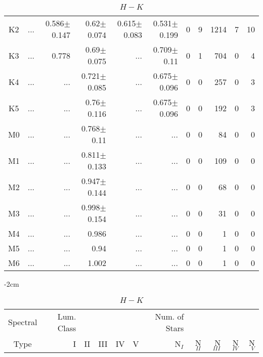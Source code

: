 \begin{table}[t]
\begin{table}[t]
\begin{center}
\begin{tabular}{c|rrrrr|rrrrr}
    K2	&	 ...	&	0.586$\pm$0.147	&	0.62$\pm$0.074	&	0.615$\pm$0.083	&	0.531$\pm$0.199	&	0	&	9	&	1214	&	7	&	10	\\
    K3	&	 ...	&	0.778	&	0.69$\pm$0.075	&	 ...	&	0.709$\pm$0.11	&	0	&	1	&	704	&	0	&	4	\\
    K4	&	 ...	&	 ...	&	0.721$\pm$0.085	&	 ...	&	0.675$\pm$0.096	&	0	&	0	&	257	&	0	&	3	\\
    K5	&	 ...	&	 ...	&	0.76$\pm$0.116	&	 ...	&	0.675$\pm$0.096	&	0	&	0	&	192	&	0	&	3	\\
    M0	&	 ...	&	 ...	&	0.768$\pm$0.11	&	 ...	&	 ...	&	0	&	0	&	84	&	0	&	0	\\
    M1	&	 ...	&	 ...	&	0.811$\pm$0.133	&	 ...	&	 ...	&	0	&	0	&	109	&	0	&	0	\\
    M2	&	 ...	&	 ...	&	0.947$\pm$0.144	&	 ...	&	 ...	&	0	&	0	&	68	&	0	&	0	\\
    M3	&	 ...	&	 ...	&	0.998$\pm$0.154	&	 ...	&	 ...	&	0	&	0	&	31	&	0	&	0	\\
    M4	&	 ...	&	 ...	&	0.986	&	 ...	&	 ...	&	0	&	0	&	1	&	0	&	0	\\
    M5	&	 ...	&	 ...	&	0.94	&	 ...	&	 ...	&	0	&	0	&	1	&	0	&	0	\\
    M6	&	 ...	&	 ...	&	1.002	&	 ...	&	 ...	&	0	&	0	&	1	&	0	&	0	\\
        \bottomrule
        \end{tabular}
    \end{center}
    \end{table}
    
    
    \begin{table}[t]
    \tiny
    \centering
    \caption{$H-K$}
    \begin{center}
        \addtolength{\leftskip} {-2cm}
        \addtolength{\rightskip}{-2cm}
        \begin{tabular}{c|rrrrr|rrrrr}
        \toprule
        Spectral & Lum. Class & & & & & Num. of Stars & & & &  \\
        Type & I & II & III &  IV & V & N$_{I}$ & N$_{II}$ & N$_{III}$ & N$_{IV}$ & N$_{V}$ \\ \midrule
      

\end{tabular}
\end{center}
\end{table}
\end{table}
